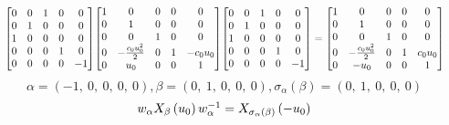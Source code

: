 \documentclass[11pt]{article}
\theoremstyle{definition}
\begin{document}
\[
\scaletoalign{\textwidth}{{\left[\begin{matrix}0 & 0 & 1 & 0 & 0\\0 & 1 & 0 & 0 & 0\\1 & 0 & 0 & 0 & 0\\0 & 0 & 0 & 1 & 0\\0 & 0 & 0 & 0 & -1\end{matrix}\right]} {\left[\begin{matrix}1 & 0 & 0 & 0 & 0\\0 & 1 & 0 & 0 & 0\\0 & 0 & 1 & 0 & 0\\0 & - \frac{c_{0} u_{0}^{2}}{2} & 0 & 1 & - c_{0} u_{0}\\0 & u_{0} & 0 & 0 & 1\end{matrix}\right]} {\left[\begin{matrix}0 & 0 & 1 & 0 & 0\\0 & 1 & 0 & 0 & 0\\1 & 0 & 0 & 0 & 0\\0 & 0 & 0 & 1 & 0\\0 & 0 & 0 & 0 & -1\end{matrix}\right]} = {\left[\begin{matrix}1 & 0 & 0 & 0 & 0\\0 & 1 & 0 & 0 & 0\\0 & 0 & 1 & 0 & 0\\0 & - \frac{c_{0} u_{0}^{2}}{2} & 0 & 1 & c_{0} u_{0}\\0 & - u_{0} & 0 & 0 & 1\end{matrix}\right]}}
\]
\[
\alpha = \left( -1, \  0, \  0, \  0, \  0\right), \beta = \left( 0, \  1, \  0, \  0, \  0\right), \sigma_{\alpha}(\beta) = \left( 0, \  1, \  0, \  0, \  0\right)
\]
\[
\scaletoalign{\textwidth}{w_{\alpha} X_{\beta}\left(u_{0}\right) w_{\alpha}^{-1} = X_{\sigma_{\alpha}\left(\beta\right)}\left(- u_{0}\right)}
\]
\end{document}
